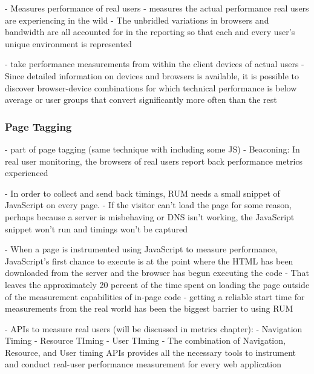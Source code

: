 - Measures performance of real users
- measures the actual performance real users are experiencing in the wild
- The unbridled variations in browsers and bandwidth are all accounted for in the reporting so that each and every user’s unique environment is represented




- take performance measurements from within the client devices of actual users
- Since detailed information on devices and browsers is available, it is possible to discover browser-device combinations for which technical performance is below average or user groups that convert significantly more often than the rest




\subsubsection{Page Tagging}

- part of page tagging (same technique with including some JS)
- Beaconing: In real user monitoring, the browsers of real users report back performance metrics experienced


- In order to collect and send back timings, RUM needs a small snippet of JavaScript on every page. 
- If the visitor can’t load the page for some reason, perhaps because a server is misbehaving or DNS isn’t working, the JavaScript snippet won’t run and timings won’t be captured



- When a page is instrumented using JavaScript to measure performance, JavaScript’s first chance to execute is at the point where the HTML has been downloaded from the server and the browser has begun executing the code
- That leaves the approximately 20 percent of the time spent on loading the page outside of the measurement capabilities of in-page code
- getting a reliable start time for measurements from the real world has been the biggest barrier to using RUM



- APIs to measure real users (will be discussed in metrics chapter):
- Navigation Timing
- Resource TIming
- User TIming
- The combination of Navigation, Resource, and User timing APIs provides all the necessary tools to instrument and conduct real-user performance measurement for every web application




